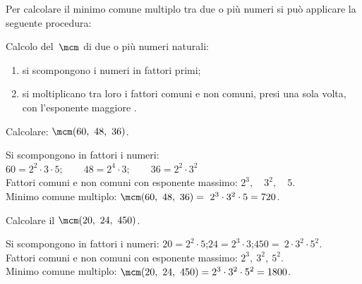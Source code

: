Per calcolare il minimo comune multiplo tra due o più numeri si può 
applicare la seguente procedura:

\begin{procedura}{}{}
Calcolo del~\(\mcm\) di due o più numeri naturali:
\begin{enumerate}[noitemsep, label=(\alph*)]
 \item si scompongono i numeri in fattori primi;
 \item si moltiplicano tra loro i fattori comuni e non comuni, 
  presi una sola volta, con l'esponente maggiore .
\end{enumerate}
\end{procedura}

\begin{esempio}{}{}
Calcolare: \quad \(\mcm(60,~48,~36)\).

Si scompongono in fattori i numeri: \\
\(60 = 2^2 \cdot 3 \cdot 5; 
  \qquad 48 = 2^4 \cdot 3; 
  \qquad 36 = 2^2 \cdot 3^2\)\\
Fattori comuni e non comuni con esponente massimo: 
\(2^3,\quad 3^2, \quad 5\).\\ 
Minimo comune multiplo: \quad 
\(\mcm(60,~48,~36)=~2^3 \cdot 3^2 \cdot 5 = 720\).
\end{esempio}

\begin{esempio}{}{}
Calcolare il \quad \(\mcm(20,~24,~450)\).

Si scompongono in fattori i numeri: \quad
\(20=2^2\cdot5\);\quad\(24=2^3\cdot3\);\quad\(450 =~2\cdot3^2\cdot5^2\).\\
Fattori comuni e non comuni con esponente massimo: 
\(2^3,~3^2,~5^ 2\).\\
Minimo comune multiplo: \quad 
\(\mcm(20,~24,~450) = 2^3 \cdot 3^2 \cdot 5^ 2 = 1800\).
\end{esempio}

